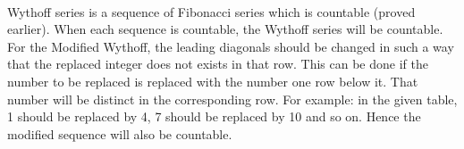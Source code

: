 \documentclass[addpoints]{exam}
\begin{document}
\begin{questions}
\begin{parts}
  \begin{solution}\\
  Wythoff series is a sequence of Fibonacci series which is countable (proved earlier). When each sequence is countable, the Wythoff series will be countable. \\
  For the Modified Wythoff, the leading diagonals should be changed in such a way that the replaced integer does not exists in that row. This can be done if the number to be replaced is replaced with the number one row below it. That number will be distinct in the corresponding row. For example: in the given table, 1 should be replaced by 4, 7 should be replaced by 10 and so on. Hence the modified sequence will also be countable.
  
  
  \end{solution}
\end{parts}

\end{questions}
\end{document}
